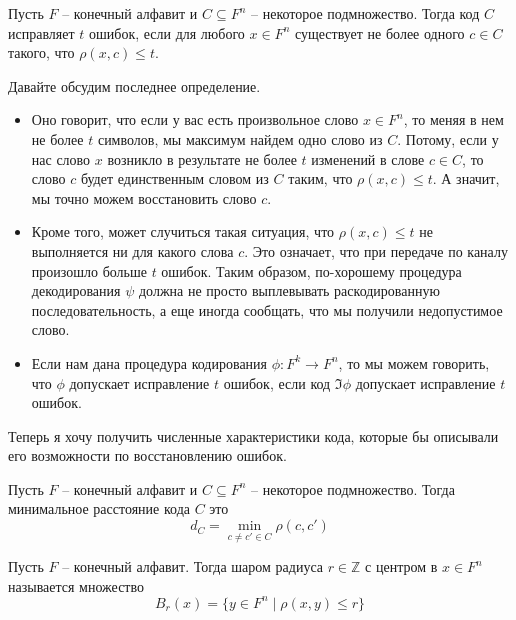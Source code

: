 \begin{definition}
Пусть $F$ -- конечный алфавит и $C\subseteq F^n$ -- некоторое подмножество.
Тогда код $C$ исправляет $t$ ошибок, если для любого $x\in F^n$ существует не более одного $c\in C$ такого, что $\rho(x, c) \leqslant t$.
\end{definition}

Давайте обсудим последнее определение.
\begin{itemize}
\item
Оно говорит, что если у вас есть произвольное слово $x\in F^n$, то меняя в нем не более $t$ символов, мы максимум найдем одно слово из $C$.
Потому, если у нас слово $x$ возникло в результате не более $t$ изменений в слове $c\in C$, то слово $c$ будет единственным словом из $C$ таким, что $\rho(x, c) \leqslant t$.
А значит, мы точно можем восстановить слово $c$.

\item Кроме того, может случиться такая ситуация, что $\rho(x, c) \leqslant t$ не выполняется ни для какого слова $c$.
Это означает, что при передаче по каналу произошло больше $t$ ошибок.
Таким образом, по-хорошему процедура декодирования $\psi$ должна не просто выплевывать раскодированную последовательность, а еще иногда сообщать, что мы получили недопустимое слово.

\item Если нам дана процедура кодирования $\phi\colon F^k \to F^n$, то мы можем говорить, что $\phi$ допускает исправление $t$ ошибок, если код $\Im \phi$ допускает исправление $t$ ошибок.
\end{itemize}

Теперь я хочу получить численные характеристики кода, которые бы описывали его возможности по восстановлению ошибок.

\begin{definition}
Пусть $F$ -- конечный алфавит и $C\subseteq F^n$ -- некоторое подмножество.
Тогда минимальное расстояние кода $C$ это
\[
d_C = \min_{c\neq c' \in C} \rho(c, c')
\]
\end{definition}

\begin{definition}
Пусть $F$ -- конечный алфавит.
Тогда шаром радиуса $r\in \mathbb Z$ с центром в $x\in F^n$ называется множество
\[
B_r(x) = \{y\in F^n \mid \rho(x, y) \leqslant r\}
\]
\end{definition}

